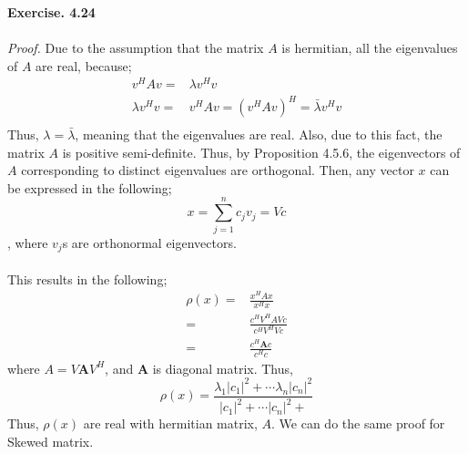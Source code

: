 \documentclass[letterpaper,12pt]{article}
\theoremstyle{definition}
\begin{document}
\textbf{Exercise. 4.24}\\\\
\emph{Proof.} Due to the assumption that the matrix $A$ is hermitian, all the eigenvalues of $A$ are real, because;
\begin{align*}
  v^H A v =& \lambda v^H v \\
  \lambda v^H v =& v^H Av = (v^H A v)^H  = \bar{\lambda} v^H v\\
\end{align*}
Thus, $\lambda = \bar{\lambda}$, meaning that the eigenvalues are real. Also, due to this fact, the matrix $A$ is positive semi-definite.  Thus, by Proposition 4.5.6, the eigenvectors of $A$ corresponding to distinct eigenvalues are orthogonal. Then, any vector $x$ can be expressed in the following;
\[x = \sum_{j=1}^{n} c_j v_j = Vc \], where $v_j$s are orthonormal eigenvectors.  \\\\
This results in the following;
\begin{align*}
  \rho(x) =& \frac{x^H A x}{x^H x}  \\
   =& \frac{c^H V^H A V c}{c^H V^H V c}  \\
   =& \frac{c^H \textbf{A} c}{c^H c}
\end{align*}
where $A = V \textbf{A} V^H$, and $\textbf{A}$ is diagonal matrix. Thus,
\[\rho(x) = \frac{\lambda_1 |c_1|^2 + \cdots \lambda_n |c_n|^2 }{|c_1|^2 + \cdots |c_n|^2 +} \]
Thus, $\rho(x)$ are real with hermitian matrix, $A$.
We can do the same proof for Skewed matrix.
\end{document}
